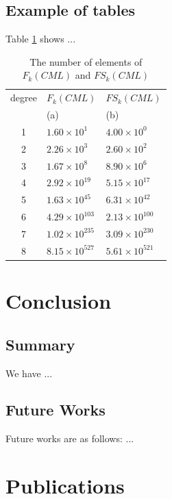 \documentclass[12pt,epsf]{report}
\begin{document}
 \section{Example of tables}

 Table \ref{tab:num_of_schemata_satisfied_srp} shows ...
 
 \begin{table}[tb]
\begin{center}
\caption{The number of elements of $F_{k}(CML)$ and $FS_{k}(CML)$}
\label{tab:num_of_schemata_satisfied_srp}
 \begin{tabular}{c l l}
  \hline
 degree & $F_{k}(CML)$ &$FS_{k}(CML)$ \\
    & (a)&  (b)\\ 
  \hline
  \hline
  1 &  $1.60 \times 10^{1}$ & $4.00 \times 10^{0}$\\
  2 & $2.26 \times 10^{3}$ & $2.60 \times 10^{2}$  \\
  3 & $1.67 \times 10^{8}$ & $8.90 \times 10^{6}$\\
  4 & $2.92 \times 10^{19}$ & $5.15 \times 10^{17}$\\
  5 & $1.63 \times 10^{45}$ & $6.31 \times 10^{42}$\\
  6 & $4.29 \times 10^{103}$ & $2.13 \times 10^{100}$\\
  7 & $1.02 \times 10^{235}$ & $3.09 \times 10^{230}$\\
  8 & $8.15 \times 10^{527}$ & $5.61 \times 10^{521}$\\ 
  \hline
 \end{tabular}
\end{center}
\end{table}


\chapter{Conclusion}
\section{Summary}

We have ...

\section{Future Works}

Future works are as follows: ...

\newpage

\chapter*{Publications}
\end{document}
